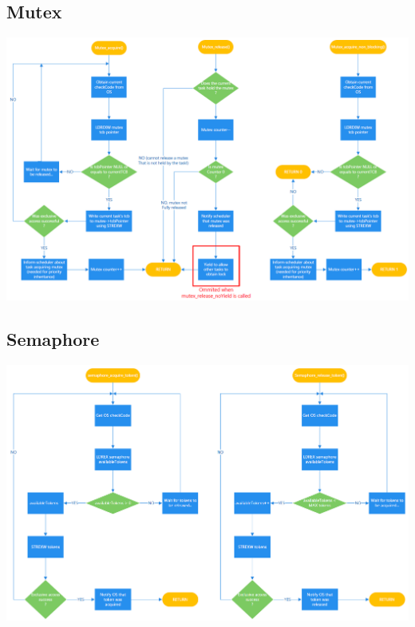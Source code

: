 \documentclass[12pt,a4paper]{article}
\begin{document}
\subsection{Mutex}
\includegraphics[width=1\textwidth]{images/Mutex.png}\\
\subsection{Semaphore}
\includegraphics[width=1\textwidth]{images/Semaphore.png}
\end{document}
